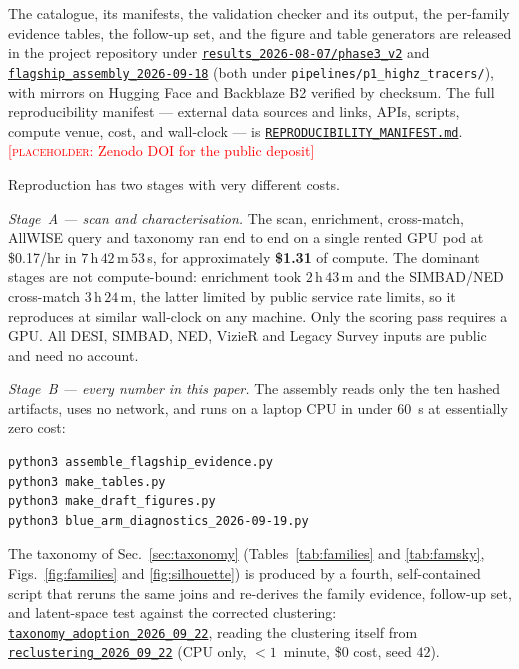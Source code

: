 \documentclass[aps,prd,twocolumn,superscriptaddress,nofootinbib,longbibliography,floatfix]{revtex4-2}
\newcommand{\repoSHA}{main}
\newcommand{\artifactlink}[2]{\href{https://github.com/Hubify-Projects/bigbounce/blob/\repoSHA/#1}{\texttt{#2}}}
\newcommand{\artifactdirlink}[2]{\href{https://github.com/Hubify-Projects/bigbounce/tree/\repoSHA/#1}{\texttt{#2}}}
\newcommand{\TODO}[1]{\textcolor{red}{[\textsc{placeholder}: #1]}}
\begin{document}
The catalogue, its manifests, the validation checker and its output, the
per-family evidence tables, the follow-up set, and the figure and table
generators are released in the project repository under
\artifactdirlink{pipelines/p1_highz_tracers/clean_rerun/results_2026-08-07/phase3_v2}{results\_2026-08-07/}\-\artifactdirlink{pipelines/p1_highz_tracers/clean_rerun/results_2026-08-07/phase3_v2}{phase3\_v2}
and
\artifactdirlink{pipelines/p1_highz_tracers/flagship_assembly_2026-09-18}{flagship\_assembly\_}\-\artifactdirlink{pipelines/p1_highz_tracers/flagship_assembly_2026-09-18}{2026-09-18}
(both under \texttt{pipelines/p1\_highz\_tracers/}), with mirrors on Hugging
Face and Backblaze B2 verified by checksum. The full reproducibility manifest
--- external data sources and links, APIs, scripts, compute venue, cost, and
wall-clock --- is
\artifactlink{pipelines/p1_highz_tracers/anomaly_flagship_draft/REPRODUCIBILITY_MANIFEST.md}{REPRODUCIBILITY\_}\-\artifactlink{pipelines/p1_highz_tracers/anomaly_flagship_draft/REPRODUCIBILITY_MANIFEST.md}{MANIFEST.md}.
\TODO{Zenodo DOI for the public deposit}

Reproduction has two stages with very different costs.

\emph{Stage~A --- scan and characterisation.} The scan, enrichment,
cross-match, AllWISE query and taxonomy ran end to end on a single rented GPU
pod at \$0.17/hr in $7$\,h\,$42$\,m\,$53$\,s, for approximately
\textbf{\$1.31} of compute.
The dominant stages are not compute-bound: enrichment took $2$\,h\,$43$\,m
and the SIMBAD/NED cross-match $3$\,h\,$24$\,m, the latter limited by public
service rate limits, so it reproduces at similar wall-clock on any machine.
Only the scoring pass requires a GPU. All DESI, SIMBAD, NED, VizieR and
Legacy Survey inputs are public and need no account.

\emph{Stage~B --- every number in this paper.} The assembly reads only the
ten hashed artifacts, uses no network, and runs on a laptop CPU in under
$60$~s at essentially zero cost:

\begin{verbatim}
python3 assemble_flagship_evidence.py
python3 make_tables.py
python3 make_draft_figures.py
python3 blue_arm_diagnostics_2026-09-19.py
\end{verbatim}

\noindent The taxonomy of Sec.~\ref{sec:taxonomy} (Tables~\ref{tab:families}
and \ref{tab:famsky}, Figs.~\ref{fig:families} and \ref{fig:silhouette}) is
produced by a fourth, self-contained script that reruns the same joins and
re-derives the family evidence, follow-up set, and latent-space test against
the corrected clustering: \artifactdirlink{pipelines/p1_highz_tracers/anomaly_flagship_draft/taxonomy_adoption_2026_09_22}{taxonomy\_adoption\_2026\_09\_22},
reading the clustering itself from
\artifactdirlink{pipelines/p1_highz_tracers/anomaly_flagship_draft/reclustering_2026_09_22}{reclustering\_2026\_09\_22}
(CPU only, $<1$~minute, \$0 cost, seed $42$).
\end{document}
